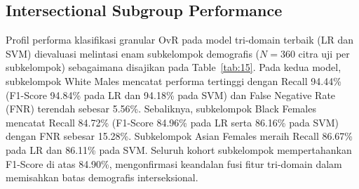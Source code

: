 \subsection{Intersectional Subgroup Performance}
\label{sec:intersectional_subgroup_performance}
\label{sec:subgroup_performance}

Profil performa klasifikasi granular OvR pada model tri-domain terbaik (LR dan SVM) dievaluasi melintasi enam subkelompok demografis ($N = 360$ citra uji per subkelompok) sebagaimana disajikan pada Table~\ref{tab:15}. Pada kedua model, subkelompok White Males mencatat performa tertinggi dengan Recall 94.44\% (F1-Score 94.84\% pada LR dan 94.18\% pada SVM) dan False Negative Rate (FNR) terendah sebesar 5.56\%. Sebaliknya, subkelompok Black Females mencatat Recall 84.72\% (F1-Score 84.96\% pada LR serta 86.16\% pada SVM) dengan FNR sebesar 15.28\%. Subkelompok Asian Females meraih Recall 86.67\% pada LR dan 86.11\% pada SVM. Seluruh kohort subkelompok mempertahankan F1-Score di atas 84.90\%, mengonfirmasi keandalan fusi fitur tri-domain dalam memisahkan batas demografis interseksional.

\begin{table}[htbp]
\caption{Intersectional Subgroup Performance and Algorithmic Fairness Profile.}
\label{tab:15}
\label{tab:XV}
\centering
\footnotesize
\setlength{\tabcolsep}{6pt}
\end{table}

